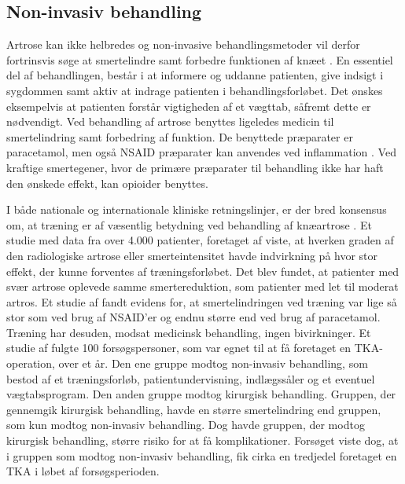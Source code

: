\subsection{Non-invasiv behandling}
Artrose kan ikke helbredes og non-invasive behandlingsmetoder vil derfor fortrinsvis søge at smertelindre samt forbedre funktionen af knæet \citep{brostrom2012}. En essentiel del af behandlingen, består i at informere og uddanne patienten, give indsigt i sygdommen samt aktiv at indrage patienten i behandlingsforløbet. Det ønskes eksempelvis at patienten forstår vigtigheden af et vægttab, såfremt dette er nødvendigt. \citep{brostrom2012}
Ved behandling af artrose benyttes ligeledes medicin  til smertelindring samt forbedring af funktion. De benyttede præparater er paracetamol, men også NSAID præparater kan anvendes ved inflammation \citep{schroder}. Ved kraftige smertegener, hvor de primære præparater til behandling ikke har haft den ønskede effekt, kan opioider benyttes. \citep{brostrom2012}

I både nationale og internationale kliniske retningslinjer, er der bred konsensus om, at træning er af væsentlig betydning ved behandling af knæartrose \citep{brostrom2012}. Et studie med data fra over 4.000 patienter, foretaget af  viste, at hverken graden af den radiologiske artrose eller smerteintensitet havde indvirkning på hvor stor effekt, der kunne forventes af træningsforløbet. Det blev fundet, at patienter med svær artrose oplevede samme smertereduktion, som patienter med let til moderat artros. Et studie af  fandt evidens for, at smertelindringen ved træning var lige så stor som ved brug af NSAID'er og endnu større end ved brug af paracetamol. Træning har desuden, modsat medicinsk behandling,  ingen bivirkninger. \citep{sorenskou}
Et studie af  fulgte 100 forsøgspersoner, som var egnet til at få foretaget en TKA-operation, over et år. Den ene gruppe modtog non-invasiv behandling, som bestod af et træningsforløb, patientundervisning, indlægssåler og et eventuel vægtabsprogram. Den anden gruppe modtog kirurgisk behandling. Gruppen, der gennemgik kirurgisk behandling, havde en større smertelindring end gruppen, som kun modtog non-invasiv behandling. Dog havde gruppen, der modtog kirurgisk behandling, større risiko for at få komplikationer. Forsøget viste dog, at i gruppen som modtog non-invasiv behandling, fik cirka en tredjedel foretaget en TKA i løbet af forsøgsperioden. \citep{newEngland} 


